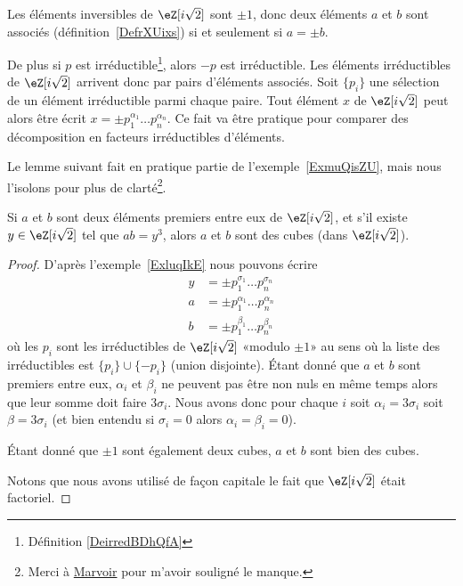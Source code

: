 \begin{example} \label{ExluqIkE}
    Les éléments inversibles de \( \eZ[i\sqrt{2}]\) sont \( \pm 1\), donc deux éléments \( a\) et \( b\) sont associés (définition~\ref{DefrXUixs}) si et seulement si \( a=\pm b\).

    De plus si \( p\) est irréductible\footnote{Définition \ref{DeirredBDhQfA}}, alors \( -p\) est irréductible. Les éléments irréductibles de \( \eZ[i\sqrt{2}]\) arrivent donc par pairs d'éléments associés. Soit \( \{ p_i \}\) une sélection de un élément irréductible parmi chaque paire. Tout élément \( x\) de \( \eZ[i\sqrt{2}]\) peut alors être écrit \( x=\pm p_1^{\alpha_1}\ldots p_n^{\alpha_n}\). Ce fait va être pratique pour comparer des décomposition en facteurs irréductibles d'éléments.
\end{example}

Le lemme suivant fait en pratique partie de l'exemple~\ref{ExmuQisZU}, mais nous l'isolons pour plus de clarté\footnote{Merci à \href{http://fr.wikipedia.org/wiki/Utilisateur:Marvoir}{Marvoir} pour m'avoir souligné le manque.}.
\begin{lemma}       \label{LemTScCIv}
    Si \( a\) et \( b\) sont deux éléments premiers entre eux de \( \eZ[i\sqrt{2}]\), et s'il existe \( y \in  \eZ[i\sqrt{2}]\) tel que \( ab=y^3\), alors \( a\) et \( b\) sont des cubes (dans \( \eZ[i\sqrt{2}]\)).
\end{lemma}

\begin{proof}
    D'après l'exemple~\ref{ExluqIkE} nous pouvons écrire
    \begin{subequations}
        \begin{align}
            y&=\pm p_1^{\sigma_1}\ldots p_n^{\sigma_n}\\
            a&=\pm p_1^{\alpha_1}\ldots p_n^{\alpha_n}\\
            b&=\pm p_1^{\beta_1}\ldots p_n^{\beta_n}
        \end{align}
    \end{subequations}
    où les \( p_i\) sont les irréductibles de \( \eZ[i\sqrt{2}]\) «modulo \( \pm 1\)» au sens où la liste des irréductibles est \( \{ p_i \}\cup\{ -p_i \}\) (union disjointe). Étant donné que \( a\) et \( b\) sont premiers entre eux, \( \alpha_i\) et \( \beta_i\) ne peuvent pas être non nuls en même temps alors que leur somme doit faire \( 3\sigma_i\). Nous avons donc pour chaque \( i\) soit \( \alpha_i=3\sigma_i\) soit \( \beta=3\sigma_i\) (et bien entendu si \( \sigma_i=0\) alors \( \alpha_i=\beta_i=0\)).

    Étant donné que \( \pm 1\) sont également deux cubes, \( a\) et \( b\) sont bien des cubes.

    Notons que nous avons utilisé de façon capitale le fait que \( \eZ[i\sqrt{2}]\) était factoriel.
\end{proof}

